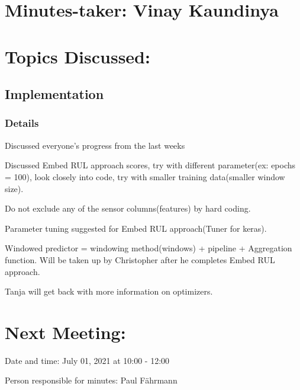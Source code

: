 \documentclass[11pt]{meetingmins} %
\begin{document}
\maketitle

\section{Minutes-taker: Vinay Kaundinya}

\section{Topics Discussed:}

\subsection{Implementation}
\subsubsection{Details}
\begin{hiddensubitems}
    \item Discussed everyone's progress from the last weeks
    \item Discussed Embed RUL approach scores, try with different parameter(ex: epochs = 100), look closely into code, try with smaller training data(smaller window size).
    \item Do not exclude any of the sensor columns(features) by hard coding.
    \item Parameter tuning suggested for Embed RUL approach(Tuner for keras).
    \item Windowed predictor = windowing method(windows) + pipeline + Aggregation function. Will be taken up by Christopher after he completes Embed RUL approach.
    \item Tanja will get back with more information on optimizers.
\end{hiddensubitems}

\section{Next Meeting:}
\begin{hiddensubitems}
    \item Date and time: July 01, 2021 at 10:00 - 12:00
    \item Person responsible for minutes: Paul Fährmann
\end{hiddensubitems}
\end{document}
